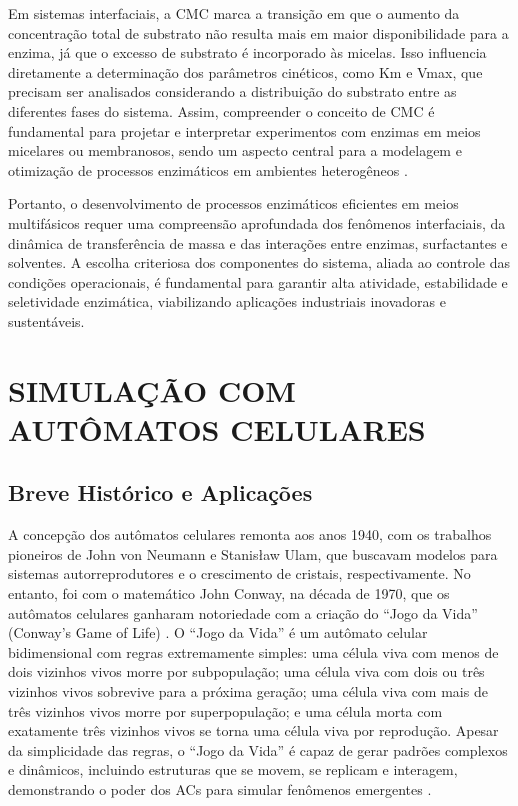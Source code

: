\documentclass[12pt,oneside]{report}
\begin{document}
Em sistemas interfaciais, a CMC marca a transição em que o aumento da concentração total de substrato não resulta mais em maior disponibilidade para a enzima, já que o excesso de substrato é incorporado às micelas. Isso influencia diretamente a determinação dos parâmetros cinéticos, como Km e Vmax, que precisam ser analisados considerando a distribuição do substrato entre as diferentes fases do sistema. Assim, compreender o conceito de CMC é fundamental para projetar e interpretar experimentos com enzimas em meios micelares ou membranosos, sendo um aspecto central para a modelagem e otimização de processos enzimáticos em ambientes heterogêneos \cite{bisswanger2017}.

Portanto, o desenvolvimento de processos enzimáticos eficientes em meios multifásicos requer uma compreensão aprofundada dos fenômenos interfaciais, da dinâmica de transferência de massa e das interações entre enzimas, surfactantes e solventes. A escolha criteriosa dos componentes do sistema, aliada ao controle das condições operacionais, é fundamental para garantir alta atividade, estabilidade e seletividade enzimática, viabilizando aplicações industriais inovadoras e sustentáveis.

\section{SIMULAÇÃO COM AUTÔMATOS CELULARES}

\subsection{Breve Histórico e Aplicações}

A concepção dos autômatos celulares remonta aos anos 1940, com os trabalhos pioneiros de John von Neumann e Stanisław Ulam, que buscavam modelos para sistemas autorreprodutores e o crescimento de cristais, respectivamente. No entanto, foi com o matemático John Conway, na década de 1970, que os autômatos celulares ganharam notoriedade com a criação do ``Jogo da Vida'' (Conway's Game of Life) \cite{Gardner1970}. O ``Jogo da Vida'' é um autômato celular bidimensional com regras extremamente simples: uma célula viva com menos de dois vizinhos vivos morre por subpopulação; uma célula viva com dois ou três vizinhos vivos sobrevive para a próxima geração; uma célula viva com mais de três vizinhos vivos morre por superpopulação; e uma célula morta com exatamente três vizinhos vivos se torna uma célula viva por reprodução. Apesar da simplicidade das regras, o ``Jogo da Vida'' é capaz de gerar padrões complexos e dinâmicos, incluindo estruturas que se movem, se replicam e interagem, demonstrando o poder dos ACs para simular fenômenos emergentes \cite{Gardner1970}.
\end{document}
